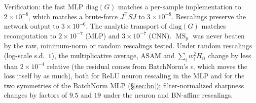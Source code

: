 \documentclass[10pt]{article}
\theoremstyle{remark}
\newcommand{\MS}{\operatorname{MS}}
\begin{document}
Verification: the fast MLP $\mathrm{diag}(G)$ matches a per-sample implementation to $2{\times}10^{-8}$, which matches a brute-force $J^\top SJ$ to $3{\times}10^{-8}$. Rescalings preserve the network output to $3{\times}10^{-6}$. The analytic transport of $\mathrm{diag}(G)$ matches recomputation to $2{\times}10^{-7}$ (MLP) and $3{\times}10^{-7}$ (CNN). $\MS_p$ was never beaten by the raw, minimum-norm or random rescalings tested. Under random rescalings (log-scale s.d.\ $1$), the multiplicative average, ASAM and $\sum_iw_i^2H_{ii}$ change by less than $2{\times}10^{-4}$ relative (the residual comes from BatchNorm's $\epsilon$, which moves the loss itself by as much), both for ReLU neuron rescaling in the MLP and for the two symmetries of the BatchNorm MLP (\S\ref{sec:bn}); filter-normalized sharpness changes by factors of $9.5$ and $19$ under the neuron and BN-affine rescalings.
\end{document}
